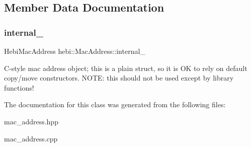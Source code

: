 \subsection{Member Data Documentation}
\mbox{\label{classhebi_1_1MacAddress_ad199d2d2ce7c50825f8d75ade88dd4e7}} 
\subsubsection{\texorpdfstring{internal\+\_\+}{internal\_}}
{\footnotesize\ttfamily Hebi\+Mac\+Address hebi\+::\+Mac\+Address\+::internal\+\_\+}

C-\/style mac address object; this is a plain struct, so it is OK to rely on default copy/move constructors. N\+O\+TE\+: this should not be used except by library functions! 

The documentation for this class was generated from the following files\+:\begin{DoxyCompactItemize}
\item 
mac\+\_\+address.\+hpp\item 
mac\+\_\+address.\+cpp\end{DoxyCompactItemize}
